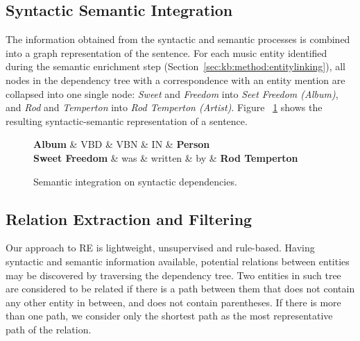 \subsection{Syntactic Semantic Integration}
\label{sec:kb:method:syntsemint}

The information obtained from the syntactic and semantic processes is combined into a graph representation of the sentence. For each music entity identified during the semantic enrichment step (Section~\ref{sec:kb:method:entitylinking}), all nodes in the dependency tree with a correspondence with an entity mention are collapsed into one single node: \textit{Sweet} and \textit{Freedom} into \textit{Seet Freedom (Album)}, and \textit{Rod} and \textit{Temperton} into \textit{Rod Temperton (Artist)}. Figure ~\ref{fig:kb:sampletree_combined} shows the resulting syntactic-semantic representation of a sentence.

\begin{figure}[!htb]
\centering
\begin{dependency}
\begin{deptext}[column sep=.0cm]
\textbf{Album} \& VBD \& VBN \& IN \& \textbf{Person} \\
\textbf{Sweet Freedom} \& was \& written \& by \& \textbf{Rod Temperton} \\
\end{deptext}



\end{dependency}
\vspace*{-5mm}
\caption{Semantic integration on syntactic dependencies.}
\label{fig:kb:sampletree_combined}
\end{figure}


\subsection{Relation Extraction and Filtering}
\label{sec:kb:method:re-filtering}

Our approach to RE is lightweight, unsupervised and rule-based. Having syntactic and semantic information available, potential relations between entities may be discovered by traversing the dependency tree.
Two entities in such tree are considered to be related if there is a path between them that does not contain any other entity in between, and does not contain parentheses. If there is more than one path, we consider only the shortest path as the most representative path of the relation.

